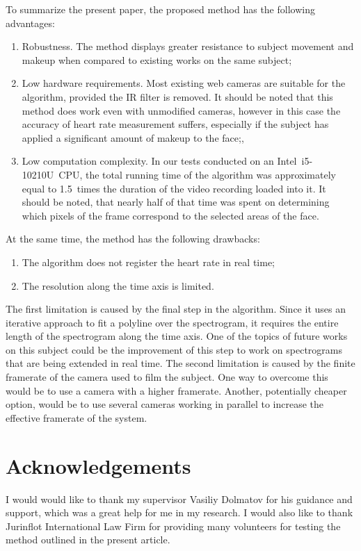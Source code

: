 To summarize the present paper, the proposed method has the following advantages:

\begin{enumerate}
    \item Robustness. The method displays greater resistance to subject movement and makeup when compared to existing works on the same subject;
    \item Low hardware requirements. Most existing web cameras are suitable for the algorithm, provided the IR filter is removed. It should be noted that this method does work even with unmodified cameras, however in this case the accuracy of heart rate measurement suffers, especially if the subject has applied a significant amount of makeup to the face;,
    \item Low computation complexity. In our tests conducted on an Intel~i5-10210U~CPU, the total running time of the algorithm was approximately equal to 1.5~times the duration of the video recording loaded into it. It should be noted, that nearly half of that time was spent on determining which pixels of the frame correspond to the selected areas of the face.
\end{enumerate}

At the same time, the method has the following drawbacks:

\begin{enumerate}
    \item The algorithm does not register the heart rate in real time;
    \item The resolution along the time axis is limited.
\end{enumerate}

The first limitation is caused by the final step in the algorithm. Since it uses an iterative approach to fit a polyline over the spectrogram, it requires the entire length of the spectrogram along the time axis. One of the topics of future works on this subject could be the improvement of this step to work on spectrograms that are being extended in real time. The second limitation is caused by the finite framerate of the camera used to film the subject. One way to overcome this would be to use a camera with a higher framerate. Another, potentially cheaper option, would be to use several cameras working in parallel to increase the effective framerate of the system.

\section{Acknowledgements}\label{acknowledgements}

I would would like to thank my supervisor Vasiliy Dolmatov for his guidance and support, which was a great help for me in my research. I would also like to thank Jurinflot International Law Firm for providing many volunteers for testing the method outlined in the present article.

\clearpage



